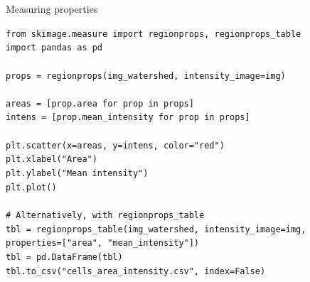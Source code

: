 \documentclass[9pt, aspectratio=169]{beamer}
\begin{document}
\begin{frame}
    {Measuring properties}
    \begin{codebox}        
        \texttt{from skimage.measure import regionprops, regionprops\_table\\
        import pandas as pd\\
        \\
        props = regionprops(img\_watershed, intensity\_image=img)\\
        \\
        areas = [prop.area for prop in props]\\
        intens = [prop.mean\_intensity for prop in props]\\
        \\
        plt.scatter(x=areas, y=intens, color="red")\\
        plt.xlabel("Area")\\
        plt.ylabel("Mean intensity")\\
        plt.plot()\\
        \\
        \pause
        \# Alternatively, with regionprops\_table\\
        tbl = regionprops\_table(img\_watershed, intensity\_image=img, \\
        properties=["area", "mean\_intensity"])      \\
        tbl = pd.DataFrame(tbl)\\
        tbl.to\_csv("cells\_area\_intensity.csv", index=False)
        }
    \end{codebox}
\end{frame}
\end{document}
